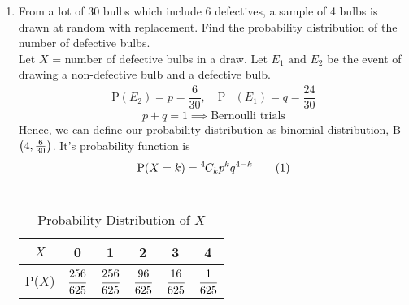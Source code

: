 \documentclass[../assign.tex]{subfiles}
\begin{document}
\begin{enumerate}[label=13.\arabic{enumi}.\arabic{enumii}]

\setcounter{enumi}{3}
\setcounter{enumii}{6}
\item From a lot of 30 bulbs which include 6 defectives, a sample of 4 bulbs is drawn at random with replacement. Find the probability distribution of the number of defective bulbs.\\[1ex]
	\solution
		Let $X$ = number of defective bulbs in a draw. Let $E_1 \text{ and } E_2$ be the event of drawing a non-defective bulb and a defective bulb.
	\begin{align*}
		\text{P}(E_2)= p = \dfrac{6}{30}, \quad \text{P}&(E_1)= q = \dfrac{24}{30}
	\end{align*}
		\[p+q=1 \implies \text{Bernoulli trials}\]
		Hence, we can define our probability distribution as binomial distribution, B$\left(4,\frac{6}{30}\right)$. It's probability function is \[\text{P($X=k$)}=\comb{4}{k}p^kq^{4-k} \numberthis \]\\[-0.9cm]
	\begin{table}[h!]
	\normalsize
	\centering
			\begin{tabular}[20pt]{|c|c|c|c|c|c|} \hline		%
			$X$&0&1&2&3&4 \T \\ \hline
			P($X$)&$\cfrac{256}{625}$&$\cfrac{256}{625}$&$\cfrac{96}{625}$&$\cfrac{16}{625}$&$\cfrac{1}{625}$\\[1.5ex] \hline
		\end{tabular}\\[2ex]
		\caption{Probability Distribution of $X$}
	\end{table}

\noindent{}

\end{enumerate}
\end{document}
